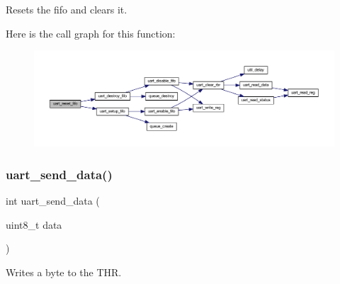 Resets the fifo and clears it. 

Here is the call graph for this function\+:\nopagebreak
\begin{figure}[H]
\begin{center}
\leavevmode
\includegraphics[width=350pt]{group__uart_ga63d2125ea0329330a0efd87bb7f4a42f_cgraph}
\end{center}
\end{figure}
\mbox{\label{group__uart_gae1d1c17871aeba317b0582a22006aa94}} 
\subsubsection{\texorpdfstring{uart\+\_\+send\+\_\+data()}{uart\_send\_data()}}
{\footnotesize\ttfamily int uart\+\_\+send\+\_\+data (\begin{DoxyParamCaption}\item[{uint8\+\_\+t}]{data }\end{DoxyParamCaption})}



Writes a byte to the T\+HR. 


